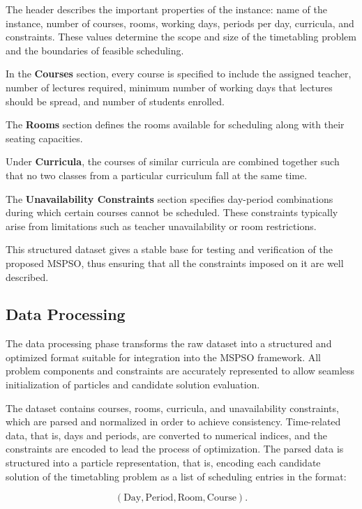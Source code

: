 \clearpage

The header describes the important properties of the instance: name of the instance, number of courses, rooms, working days, periods per day, curricula, and constraints. These values determine the scope and size of the timetabling problem and the boundaries of feasible scheduling.

In the \textbf{Courses} section, every course is specified to include the assigned teacher, number of lectures required, minimum number of working days that lectures should be spread, and number of students enrolled. 

The \textbf{Rooms} section defines the rooms available for scheduling along with their seating capacities. 

Under \textbf{Curricula}, the courses of similar curricula are combined together such that no two classes from a particular curriculum fall at the same time. 


The \textbf{Unavailability Constraints} section specifies day-period combinations during which certain courses cannot be scheduled. These constraints typically arise from limitations such as teacher unavailability or room restrictions. 

This structured dataset gives a stable base for testing and verification of the proposed MSPSO, thus ensuring that all the constraints imposed on it are well described.

\subsection{Data Processing}
\label{subsec:data_processing}

The data processing phase transforms the raw dataset into a structured and optimized format suitable for integration into the MSPSO framework. All problem components and constraints are accurately represented to allow seamless initialization of particles and candidate solution evaluation.

The dataset contains courses, rooms, curricula, and unavailability constraints, which are parsed and normalized in order to achieve consistency. Time-related data, that is, days and periods, are converted to numerical indices, and the constraints are encoded to lead the process of optimization. The parsed data is structured into a particle representation, that is, encoding each candidate solution of the timetabling problem as a list of scheduling entries in the format:

\[
(\text{Day}, \text{Period}, \text{Room}, \text{Course}).
\]

